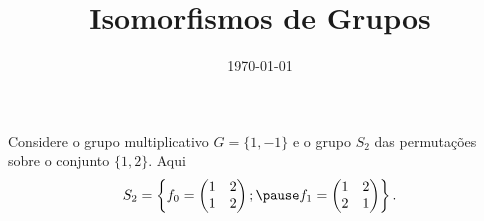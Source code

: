 \documentclass{beamer}
\title{Isomorfismos de Grupos}
\author[\autor]{\autor}
\institute[\instituto]{\instituto}
\date{\today}
\begin{document}
    \begin{frame}
        \maketitle
    \end{frame}


    \begin{frame}
        Considere o grupo multiplicativo $G = \{1, -1\}$ \pause e o grupo $S_2$ das permutações sobre o conjunto $\{1,2\}$. \pause Aqui
        \[
            S_2 = \left\{f_0 = \begin{pmatrix}
                1 & 2\\1 & 2
            \end{pmatrix}; \pause f_1 = \begin{pmatrix}
                1 & 2\\2 & 1
            \end{pmatrix}\right\}.
        \]
    \end{frame}
\end{document}
